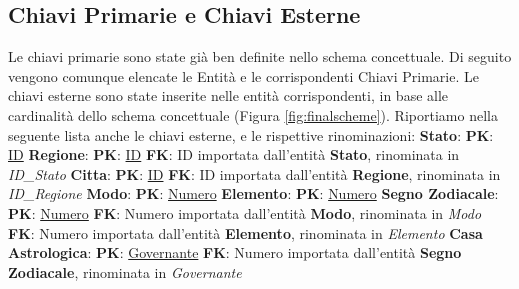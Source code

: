 \subsection{Chiavi Primarie e Chiavi Esterne}
Le chiavi primarie sono state già ben definite nello schema concettuale. Di seguito vengono comunque elencate le Entità e le corrispondenti Chiavi Primarie. Le chiavi esterne sono state inserite nelle entità corrispondenti, in base alle cardinalità dello schema concettuale (Figura \ref{fig:finalscheme}). Riportiamo nella seguente lista anche le chiavi esterne, e le rispettive rinominazioni:\newline\newline
\textbf{Stato}:\newline
\textbf{PK}: \underline{ID}\newline\newline
\textbf{Regione}:\newline
\textbf{PK}: \underline{ID}\newline
\textbf{FK}: ID importata dall'entità \textbf{Stato}, rinominata in \textit{ID\_Stato}\newline\newline
\textbf{Citta}:\newline
\textbf{PK}: \underline{ID}\newline
\textbf{FK}: ID importata dall'entità \textbf{Regione}, rinominata in \textit{ID\_Regione}\newline\newline
\textbf{Modo}:\newline
\textbf{PK}: \underline{Numero}\newline\newline
\textbf{Elemento}:\newline
\textbf{PK}: \underline{Numero}\newline\newline
\textbf{Segno Zodiacale}:\newline
\textbf{PK}: \underline{Numero}\newline
\textbf{FK}: Numero importata dall'entità \textbf{Modo}, rinominata in \textit{Modo}\newline
\textbf{FK}: Numero importata dall'entità \textbf{Elemento}, rinominata in \textit{Elemento}\newline\newline
\textbf{Casa Astrologica}:
\textbf{PK}: \underline{Governante}\newline
\textbf{FK}: Numero importata dall'entità \textbf{Segno Zodiacale}, rinominata in \textit{Governante}\newline\newline
